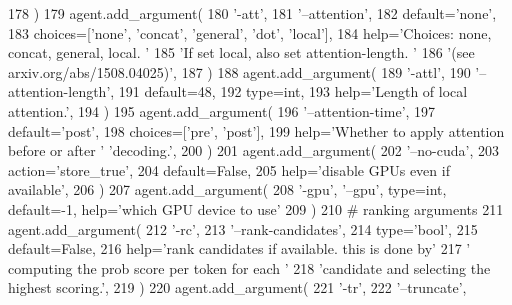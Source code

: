 \begin{DoxyCode}
178         )
179         agent.add\_argument(
180             \textcolor{stringliteral}{'-att'},
181             \textcolor{stringliteral}{'--attention'},
182             default=\textcolor{stringliteral}{'none'},
183             choices=[\textcolor{stringliteral}{'none'}, \textcolor{stringliteral}{'concat'}, \textcolor{stringliteral}{'general'}, \textcolor{stringliteral}{'dot'}, \textcolor{stringliteral}{'local'}],
184             help=\textcolor{stringliteral}{'Choices: none, concat, general, local. '}
185             \textcolor{stringliteral}{'If set local, also set attention-length. '}
186             \textcolor{stringliteral}{'(see arxiv.org/abs/1508.04025)'},
187         )
188         agent.add\_argument(
189             \textcolor{stringliteral}{'-attl'},
190             \textcolor{stringliteral}{'--attention-length'},
191             default=48,
192             type=int,
193             help=\textcolor{stringliteral}{'Length of local attention.'},
194         )
195         agent.add\_argument(
196             \textcolor{stringliteral}{'--attention-time'},
197             default=\textcolor{stringliteral}{'post'},
198             choices=[\textcolor{stringliteral}{'pre'}, \textcolor{stringliteral}{'post'}],
199             help=\textcolor{stringliteral}{'Whether to apply attention before or after '} \textcolor{stringliteral}{'decoding.'},
200         )
201         agent.add\_argument(
202             \textcolor{stringliteral}{'--no-cuda'},
203             action=\textcolor{stringliteral}{'store\_true'},
204             default=\textcolor{keyword}{False},
205             help=\textcolor{stringliteral}{'disable GPUs even if available'},
206         )
207         agent.add\_argument(
208             \textcolor{stringliteral}{'-gpu'}, \textcolor{stringliteral}{'--gpu'}, type=int, default=-1, help=\textcolor{stringliteral}{'which GPU device to use'}
209         )
210         \textcolor{comment}{# ranking arguments}
211         agent.add\_argument(
212             \textcolor{stringliteral}{'-rc'},
213             \textcolor{stringliteral}{'--rank-candidates'},
214             type=\textcolor{stringliteral}{'bool'},
215             default=\textcolor{keyword}{False},
216             help=\textcolor{stringliteral}{'rank candidates if available. this is done by'}
217             \textcolor{stringliteral}{' computing the prob score per token for each '}
218             \textcolor{stringliteral}{'candidate and selecting the highest scoring.'},
219         )
220         agent.add\_argument(
221             \textcolor{stringliteral}{'-tr'},
222             \textcolor{stringliteral}{'--truncate'},

\end{DoxyCode}
